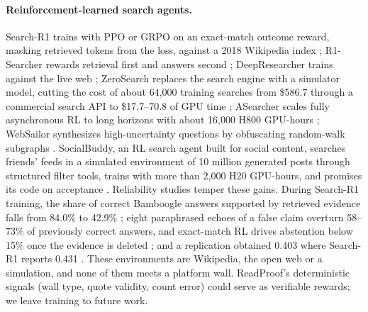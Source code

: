 \documentclass[11pt]{article}
\begin{document}
\paragraph{Reinforcement-learned search agents.}
Search-R1 trains with PPO or GRPO on an exact-match outcome reward, masking retrieved tokens from the loss,
against a 2018 Wikipedia index \citep{jin2025searchr1}; R1-Searcher rewards retrieval first and answers
second \citep{song2025r1searcher}; DeepResearcher trains against the live web \citep{zheng2025deepresearcher};
ZeroSearch replaces the search engine with a simulator model, cutting the cost of about 64{,}000 training
searches from \$586.7 through a commercial search API to \$17.7--70.8 of GPU time \citep{sun2025zerosearch};
ASearcher scales fully asynchronous RL to long horizons with about 16{,}000 H800 GPU-hours
\citep{gao2025asearcher}; WebSailor synthesizes high-uncertainty questions by obfuscating random-walk
subgraphs \citep{li2025websailor}. SocialBuddy, an RL search agent built for social content, searches
friends' feeds in a simulated environment of 10 million generated posts through structured filter tools,
trains with more than 2{,}000 H20 GPU-hours, and promises its code on acceptance \citep{li2026socialbuddy}.
Reliability studies temper these gains. During Search-R1 training, the share of correct Bamboogle answers
supported by retrieved evidence falls from 84.0\% to 42.9\% \citep{liu2026grounded}; eight paraphrased echoes
of a false claim overturn 58--73\% of previously correct answers, and exact-match RL drives abstention below
15\% once the evidence is deleted \citep{yang2026echospec}; and a replication obtained 0.403 where Search-R1
reports 0.431 \citep{xu2026howtotrain}. These environments are Wikipedia, the open web or a simulation, and
none of them meets a platform wall. ReadProof's deterministic signals (wall type, quote validity, count
error) could serve as verifiable rewards; we leave training to future work.
\end{document}
